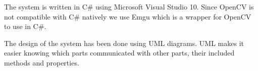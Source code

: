 The system is written in C# using Microsoft Visual Studio 10. Since OpenCV\cite{opencv} is not compatible with C# natively we use Emgu\cite{emgu} which is a wrapper for OpenCV to use in C#. 

The design of the system has been done using UML diagrams. UML makes it easier knowing which parts communicated with other parts, their included methods and properties.


